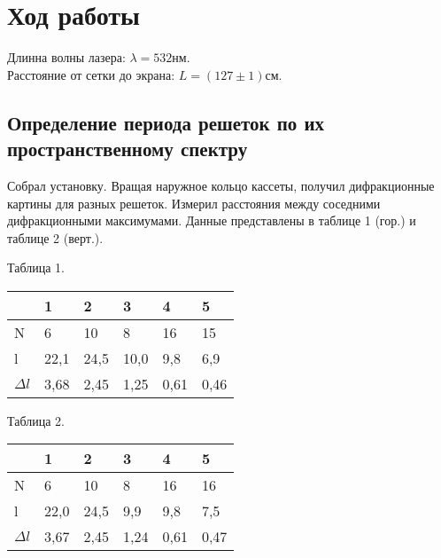 
\section{Ход работы}

Длинна волны лазера: $ \lambda = 532 \texttt{нм} $. \\
Расстояние от сетки до экрана: $ L = (127 \pm 1) \texttt{см} $.

\subsection{Определение периода решеток по их пространственному спектру}

Собрал установку. Вращая наружное кольцо кассеты, получил дифракционные картины для
разных решеток. Измерил расстояния между соседними дифракционными максимумами. Данные
представлены в таблице 1 (гор.) и таблице 2 (верт.).

\begin{table}[h!]
    \begin{center}
    Таблица 1. \\
    \begin{tabular}{|l|l|l|l|l|l|}
    \hline
                 & 1    & 2    & 3    & 4    & 5    \\ \hline
    N            & 6    & 10   & 8    & 16   & 15   \\ \hline
    l            & 22,1 & 24,5 & 10,0 & 9,8  & 6,9  \\ \hline
    $ \Delta l $ & 3,68 & 2,45 & 1,25 & 0,61 & 0,46 \\ \hline
    \end{tabular}
    \end{center}
\end{table}

\begin{table}[h!]
    \begin{center}
    Таблица 2. \\
    \begin{tabular}{|l|l|l|l|l|l|}
    \hline
                 & 1    & 2    & 3    & 4    & 5    \\ \hline
    N            & 6    & 10   & 8    & 16   & 16   \\ \hline
    l            & 22,0 & 24,5 & 9,9  & 9,8  & 7,5  \\ \hline
    $ \Delta l $ & 3,67 & 2,45 & 1,24 & 0,61 & 0,47 \\ \hline
    \end{tabular}
    \end{center}
\end{table}

